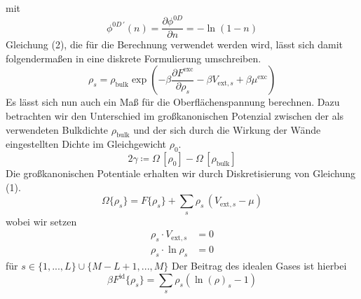 \documentclass[12pt]{article}
\begin{document}
mit
$$\phi^{0D\,'}(n)=\frac{\partial\phi^{0D}}{\partial{n}}=-\ln(1-n)$$
Gleichung (2), die für die Berechnung verwendet werden wird, lässt sich damit folgendermaßen in eine diskrete Formulierung umschreiben.
\begin{equation}\rho_s=\rho_\text{bulk}\exp\left(-\beta\frac{\partial{F^\text{exc}}}{\partial\rho_s}-\beta{V}_{\text{ext},s}+\beta\mu^\text{exc}\right)\end{equation}
Es lässt sich nun auch ein Maß für die Oberflächenspannung berechnen. Dazu betrachten wir den Unterschied im großkanonischen Potenzial zwischen der als \grqq\: verwendeten Bulkdichte $\rho_\text{bulk}$ und der sich durch die Wirkung der Wände eingestellten Dichte im Gleichgewicht $\rho_0$.
$$2\gamma\coloneqq\Omega\,[\rho_0]-\Omega\,[\rho_\text{bulk}]$$
Die großkanonischen Potentiale erhalten wir durch Diskretisierung von Gleichung (1).
\begin{equation}\Omega\{\rho_s\}=F\{\rho_s\}+\sum_s\rho_s\,(V_{\text{ext},s}-\mu)\end{equation}
wobei wir setzen
\begin{align*}\rho_s\cdot{V_{\text{ext},s}}&=0\\
\rho_s\cdot\ln\rho_s&=0\end{align*}
für $s\in\{1,...,L\}\cup\{M-L+1,...,M\}$ 
Der Beitrag des idealen Gases ist hierbei
$$\beta{F}^{\text{id}}\{\rho_s\}=\sum_s\rho_s(\ln(\rho)_s-1)$$
\end{document}
